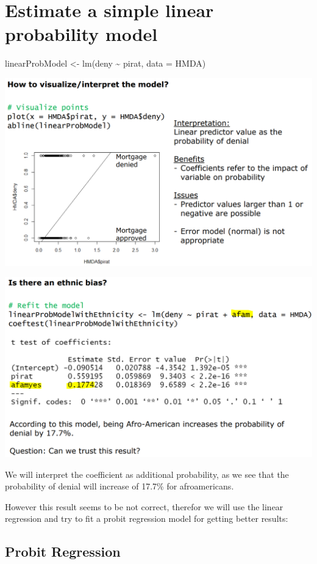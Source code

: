 \documentclass[
]{article}
\begin{document}
\hypertarget{estimate-a-simple-linear-probability-model}{%
\section{Estimate a simple linear probability
model}\label{estimate-a-simple-linear-probability-model}}

linearProbModel \textless- lm(deny \textasciitilde{} pirat, data = HMDA)

\includegraphics[width=1\linewidth]{inter}

\includegraphics[width=1\linewidth]{afro}

We will interpret the coefficient as additional probability, as we see
that the probability of denial will increase of 17.7\% for
afroamericans.

However this result seems to be not correct, therefor we will use the
linear regression and try to fit a probit regression model for getting
better results:

\hypertarget{probit-regression}{%
\subsection{Probit Regression}\label{probit-regression}}
\end{document}
